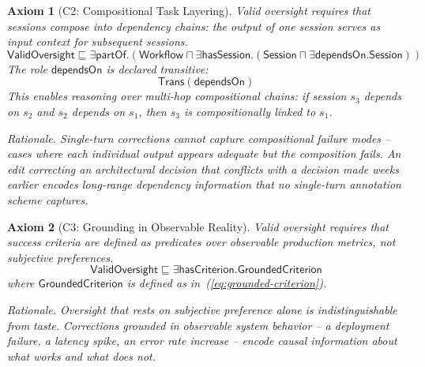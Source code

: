 \documentclass[11pt]{article}
\newtheorem{axiom}{Axiom}[section]
\newcommand{\sqsub}{\sqsubseteq}
\begin{document}
\begin{axiom}[C2: Compositional Task Layering]
\label{ax:c2}
Valid oversight requires that sessions compose into dependency chains: the output of one session serves as input context for subsequent sessions.
\begin{equation}
  \mathsf{ValidOversight} \sqsub
    \exists\mathsf{partOf}.\left(
      \mathsf{Workflow} \sqcap
      \exists\mathsf{hasSession}.\left(
        \mathsf{Session} \sqcap \exists\mathsf{dependsOn}.\mathsf{Session}
      \right)
    \right)
  \label{eq:c2}
\end{equation}
The role $\mathsf{dependsOn}$ is declared transitive:
\begin{equation}
  \mathsf{Trans}(\mathsf{dependsOn})
  \label{eq:c2-trans}
\end{equation}
This enables reasoning over multi-hop compositional chains: if session $s_3$ depends on $s_2$ and $s_2$ depends on $s_1$, then $s_3$ is compositionally linked to $s_1$.

\medskip\noindent
\emph{Rationale.}
Single-turn corrections cannot capture compositional failure modes -- cases where each individual output appears adequate but the composition fails.
An edit correcting an architectural decision that conflicts with a decision made weeks earlier encodes long-range dependency information that no single-turn annotation scheme captures.
\end{axiom}

\begin{axiom}[C3: Grounding in Observable Reality]
\label{ax:c3}
Valid oversight requires that success criteria are defined as predicates over observable production metrics, not subjective preferences.
\begin{equation}
  \mathsf{ValidOversight} \sqsub
    \exists\mathsf{hasCriterion}.\mathsf{GroundedCriterion}
  \label{eq:c3}
\end{equation}
where $\mathsf{GroundedCriterion}$ is defined as in~(\ref{eq:grounded-criterion}).

\medskip\noindent
\emph{Rationale.}
Oversight that rests on subjective preference alone is indistinguishable from taste.
Corrections grounded in observable system behavior -- a deployment failure, a latency spike, an error rate increase -- encode causal information about what works and what does not.
\end{axiom}
\end{document}
